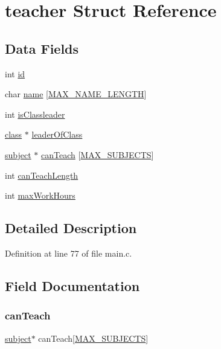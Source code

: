 \hypertarget{structteacher}{}\section{teacher Struct Reference}
\label{structteacher}
\subsection*{Data Fields}
\begin{DoxyCompactItemize}
\item 
int \hyperlink{structteacher_a7441ef0865bcb3db9b8064dd7375c1ea}{id}
\item 
char \hyperlink{structteacher_ad50982abf9e9bbbc784f8f17fa25b1b2}{name} \mbox{[}\hyperlink{main_8c_a0c397a708cec89c74029582574516b30}{M\+A\+X\+\_\+\+N\+A\+M\+E\+\_\+\+L\+E\+N\+G\+TH}\mbox{]}
\item 
int \hyperlink{structteacher_a6120a3cee2c5bb1e10db23a543a20a8a}{is\+Classleader}
\item 
\hyperlink{structclass}{class} $\ast$ \hyperlink{structteacher_a7fcc02effcf952684962b4481e328964}{leader\+Of\+Class}
\item 
\hyperlink{structsubject}{subject} $\ast$ \hyperlink{structteacher_a508916d3a3409b34215e4ca8fe608ed7}{can\+Teach} \mbox{[}\hyperlink{main_8c_ae955f276de63586aaf0c290d32652706}{M\+A\+X\+\_\+\+S\+U\+B\+J\+E\+C\+TS}\mbox{]}
\item 
int \hyperlink{structteacher_ac5f08fdd49a83d7053ba26b1c1c71e8a}{can\+Teach\+Length}
\item 
int \hyperlink{structteacher_a3f74b78dd29a3ee2e03f00567ea9b333}{max\+Work\+Hours}
\end{DoxyCompactItemize}


\subsection{Detailed Description}


Definition at line 77 of file main.\+c.



\subsection{Field Documentation}
\hypertarget{structteacher_a508916d3a3409b34215e4ca8fe608ed7}{}\label{structteacher_a508916d3a3409b34215e4ca8fe608ed7} 
\subsubsection{\texorpdfstring{can\+Teach}{canTeach}}
{\footnotesize\ttfamily \hyperlink{structsubject}{subject}$\ast$ can\+Teach\mbox{[}\hyperlink{main_8c_ae955f276de63586aaf0c290d32652706}{M\+A\+X\+\_\+\+S\+U\+B\+J\+E\+C\+TS}\mbox{]}}



